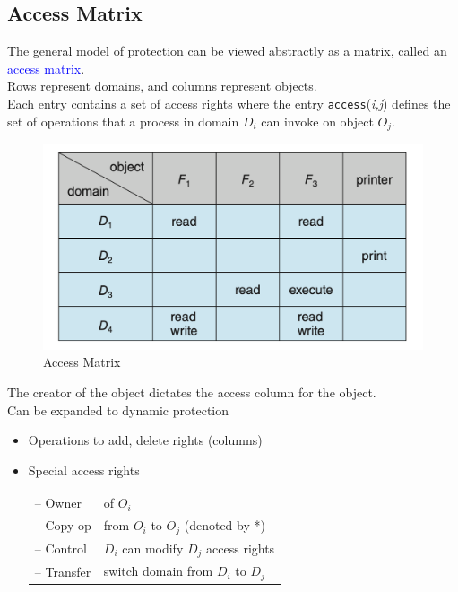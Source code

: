 \documentclass{book/custombook}
\begin{document}
            \subsection{Access Matrix}
                The general model of protection can be viewed abstractly as a matrix, called an \textcolor{blue}{access matrix}. \\
                Rows represent domains, and columns represent objects.\\
                Each entry contains a set of access rights where the entry \texttt{access}(\textit{i,j}) defines the set of operations 
                that a process in domain $D_i$ can invoke on object $O_j$.\\
                \begin{figure}[H]
                    \centering
                    \includegraphics[width=0.6\linewidth]{figures/access_matrix.png}
                    \caption{Access Matrix}
                \end{figure}
                The creator of the object dictates the access column for the object.\\
                Can be expanded to dynamic protection
                \begin{itemize}
                    \item Operations to add, delete rights (columns)
                    \item Special access rights\\
                    \begin{tabular}{ll}
                        -- Owner & of $O_i$ \\
                        -- Copy op & from $O_i$ to $O_j$ (denoted by *) \\
                        -- Control & $D_i$ can modify $D_j$ access rights \\
                        -- Transfer & switch domain from $D_i$ to $D_j$ \\
                    \end{tabular}
                \end{itemize}
\end{document}
